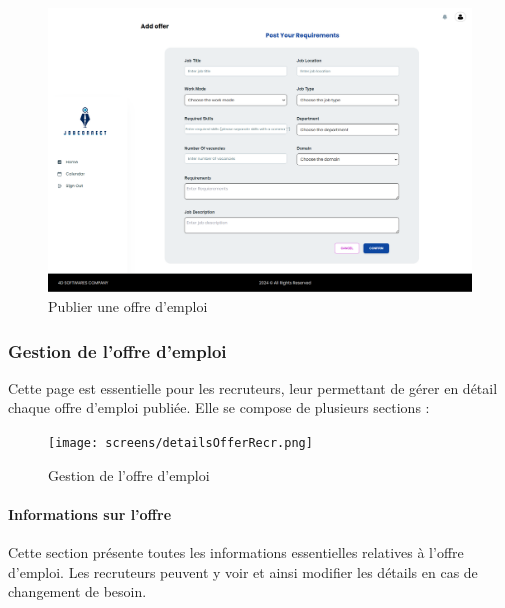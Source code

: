 \begin{figure}[htbp]
   \centering
   \includegraphics[scale=0.15]{screens/addOffer.png} 
   \caption{Publier une offre d'emploi}
   \label{fig:addOfferFields}
\end{figure}

\subsubsection{Gestion de l'offre d'emploi}
Cette page est essentielle pour les recruteurs, leur permettant de gérer en détail chaque offre d'emploi publiée. Elle se compose de plusieurs sections :
\begin{figure}[htbp]
   \centering
   \texttt{[image: screens/detailsOfferRecr.png]}
   \caption{Gestion de l'offre d'emploi}
   \label{fig:listOffers}
\end{figure}

\paragraph*{Informations sur l'offre}
Cette section présente toutes les informations essentielles 
relatives à l'offre d'emploi. Les recruteurs peuvent y voir et 
ainsi modifier les détails en cas de changement de besoin. 

